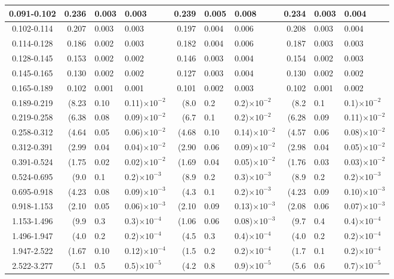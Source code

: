 \begin{table}[!htbp]
{\begin{tabular}{ | c | r@{$\pm$}l@{$\pm$}l | r@{$\pm$}l@{$\pm$}l |  r@{$\pm$}l@{$\pm$}l | }
0.091-0.102 & 0.236&0.003&0.003 & 0.239&0.005&0.008 & 0.234&0.003&0.004 \\ \hline
0.102-0.114 & 0.207&0.003&0.003 & 0.197&0.004&0.006 & 0.208&0.003&0.004 \\ \hline
0.114-0.128 & 0.186&0.002&0.003 & 0.182&0.004&0.006 & 0.187&0.003&0.003 \\ \hline
0.128-0.145 & 0.153&0.002&0.002 & 0.146&0.003&0.004 & 0.154&0.002&0.003 \\ \hline
0.145-0.165 & 0.130&0.002&0.002 & 0.127&0.003&0.004 & 0.130&0.002&0.002 \\ \hline
0.165-0.189 & 0.102&0.001&0.001 & 0.101&0.002&0.003 & 0.102&0.001&0.002 \\ \hline
0.189-0.219 & (8.23&0.10&0.11)$\times 10^{-2}$ & (8.0&0.2&0.2)$\times 10^{-2}$ & (8.2&0.1&0.1)$\times 10^{-2}$ \\ \hline
0.219-0.258 & (6.38&0.08&0.09)$\times 10^{-2}$ & (6.7&0.1&0.2)$\times 10^{-2}$ & (6.28&0.09&0.11)$\times 10^{-2}$ \\ \hline
0.258-0.312 & (4.64&0.05&0.06)$\times 10^{-2}$ & (4.68&0.10&0.14)$\times 10^{-2}$ & (4.57&0.06&0.08)$\times 10^{-2}$ \\ \hline
0.312-0.391 & (2.99&0.04&0.04)$\times 10^{-2}$ & (2.90&0.06&0.09)$\times 10^{-2}$ & (2.98&0.04&0.05)$\times 10^{-2}$ \\ \hline
0.391-0.524 & (1.75&0.02&0.02)$\times 10^{-2}$ & (1.69&0.04&0.05)$\times 10^{-2}$ & (1.76&0.03&0.03)$\times 10^{-2}$ \\ \hline
0.524-0.695 & (9.0&0.1&0.2)$\times 10^{-3}$ & (8.9&0.2&0.3)$\times 10^{-3}$ & (8.9&0.2&0.2)$\times 10^{-3}$ \\ \hline
0.695-0.918 & (4.23&0.08&0.09)$\times 10^{-3}$ & (4.3&0.1&0.2)$\times 10^{-3}$ & (4.23&0.09&0.10)$\times 10^{-3}$ \\ \hline
0.918-1.153 & (2.10&0.05&0.06)$\times 10^{-3}$ & (2.10&0.09&0.13)$\times 10^{-3}$ & (2.08&0.06&0.07)$\times 10^{-3}$ \\ \hline
1.153-1.496 & (9.9&0.3&0.3)$\times 10^{-4}$ & (1.06&0.06&0.08)$\times 10^{-3}$ & (9.7&0.4&0.4)$\times 10^{-4}$ \\ \hline
1.496-1.947 & (4.0&0.2&0.2)$\times 10^{-4}$ & (4.5&0.3&0.4)$\times 10^{-4}$ & (4.0&0.2&0.2)$\times 10^{-4}$ \\ \hline
1.947-2.522 & (1.67&0.10&0.12)$\times 10^{-4}$ & (1.5&0.2&0.2)$\times 10^{-4}$ & (1.7&0.1&0.2)$\times 10^{-4}$ \\ \hline
2.522-3.277 & (5.1&0.5&0.5)$\times 10^{-5}$ & (4.2&0.8&0.9)$\times 10^{-5}$ & (5.6&0.6&0.7)$\times 10^{-5}$ \\ \hline
\end{tabular}}
\end{table}
\clearpage

